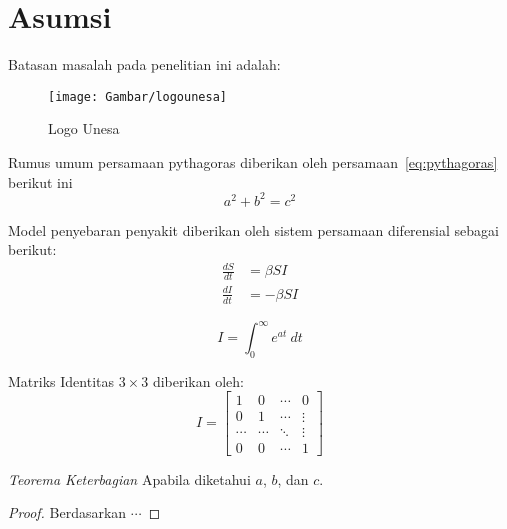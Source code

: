 \section{Asumsi}
Batasan masalah pada penelitian ini adalah:

\begin{figure}[h!]
	\centering
	\texttt{[image: Gambar/logounesa]}
	\caption{Logo Unesa}
	\label{fig:logounesa}
\end{figure}

Rumus umum persamaan pythagoras diberikan oleh persamaan~\ref{eq:pythagoras} berikut ini
\begin{equation}
	a^2 + b^2 = c^2 \label{eq:pythagoras}
\end{equation}

Model penyebaran penyakit diberikan oleh sistem persamaan diferensial sebagai berikut:
\begin{align}
	\frac{dS}{dt} &= \beta S I\\
	\nonumber \frac{dI}{dt} &= -\beta S I
\end{align}

\begin{equation}
	I = \int_0^{\infty} e^{at}~{dt}
\end{equation}

Matriks Identitas $3 \times 3$ diberikan oleh:
\begin{equation}
	I = \begin{bmatrix}
	1 & 0 & \cdots & 0\\
	0 & 1 & \cdots & \vdots\\
	\cdots & \cdots & \ddots &\vdots\\
	0 & 0 & \cdots & 1
	\end{bmatrix}
\end{equation}

\begin{theorem} \emph{Teorema Keterbagian}
	Apabila diketahui $a$, $b$, dan $c$.
\end{theorem}

\begin{proof}
	Berdasarkan $\cdots$
\end{proof}